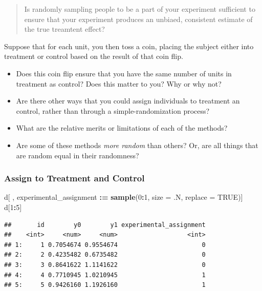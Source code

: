 \documentclass[
]{article}
\newenvironment{Shaded}{\begin{snugshade}}{\end{snugshade}}
\newcommand{\AttributeTok}[1]{\textcolor[rgb]{0.13,0.29,0.53}{#1}}
\newcommand{\ConstantTok}[1]{\textcolor[rgb]{0.56,0.35,0.01}{#1}}
\newcommand{\DecValTok}[1]{\textcolor[rgb]{0.00,0.00,0.81}{#1}}
\newcommand{\FunctionTok}[1]{\textcolor[rgb]{0.13,0.29,0.53}{\textbf{#1}}}
\newcommand{\NormalTok}[1]{#1}
\newcommand{\SpecialCharTok}[1]{\textcolor[rgb]{0.81,0.36,0.00}{\textbf{#1}}}
\providecommand{\tightlist}{%
  \setlength{\itemsep}{0pt}\setlength{\parskip}{0pt}}
\theoremstyle{definition}
\theoremstyle{definition}
\theoremstyle{definition}
\theoremstyle{definition}
\theoremstyle{remark}
\begin{document}
\begin{quote}
Is randomly sampling people to be a part of your experiment sufficient to ensure that your experiment produces an unbiaed, consistent estimate of the true treamtent effect?
\end{quote}

Suppose that for each unit, you then toss a coin, placing the subject either into treatment or control based on the result of that coin flip.

\begin{itemize}
\tightlist
\item
  Does this coin flip ensure that you have the same number of units in treatment as control? Does this matter to you? Why or why not?
\item
  Are there other ways that you could assign individuals to treatment an control, rather than through a simple-randomization process?
\item
  What are the relative merits or limitations of each of the methods?
\item
  Are some of these methods \emph{more random} than others? Or, are all things that are random equal in their randomness?
\end{itemize}

\subsubsection{Assign to Treatment and Control}\label{assign-to-treatment-and-control}

\begin{Shaded}
\begin{Highlighting}[]
\NormalTok{d[ , experimental\_assignment }\SpecialCharTok{:=} \FunctionTok{sample}\NormalTok{(}\DecValTok{0}\SpecialCharTok{:}\DecValTok{1}\NormalTok{, }\AttributeTok{size =}\NormalTok{ .N, }\AttributeTok{replace =} \ConstantTok{TRUE}\NormalTok{)]}
\NormalTok{d[}\DecValTok{1}\SpecialCharTok{:}\DecValTok{5}\NormalTok{]}
\end{Highlighting}
\end{Shaded}

\begin{verbatim}
##       id        y0        y1 experimental_assignment
##    <int>     <num>     <num>                   <int>
## 1:     1 0.7054674 0.9554674                       0
## 2:     2 0.4235482 0.6735482                       0
## 3:     3 0.8641622 1.1141622                       0
## 4:     4 0.7710945 1.0210945                       1
## 5:     5 0.9426160 1.1926160                       1
\end{verbatim}
\end{document}
